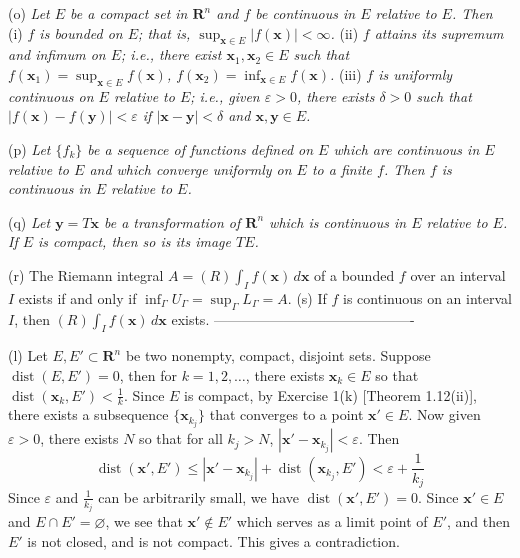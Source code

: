 \documentclass[12pt]{article}
\theoremstyle{definition}
\begin{document}
(o) 
\textit{Let $E$ be a compact set in $\mathbf{R}^n$ and $f$ be continuous in $E$ relative to $E$. Then}
(i) \textit{$f$ is bounded on $E$; that is, $\sup_{\mathbf{x}\in E}\left\vert f(\mathbf{x})\right\vert<\infty$.}
(ii) \textit{$f$ attains its supremum and infimum on $E$; i.e., there exist $\mathbf{x}_1,\mathbf{x}_2\in E$ such that $f(\mathbf{x}_1)=\sup_{\mathbf{x}\in E}f(\mathbf{x})$, $f(\mathbf{x}_2)=\inf_{\mathbf{x}\in E}f(\mathbf{x})$.}
(iii) \textit{$f$ is uniformly continuous on $E$ relative to $E$; i.e., given $\varepsilon>0$, there exists $\delta>0$ such that $\left\vert f(\mathbf{x})-f(\mathbf{y})\right\vert<\varepsilon$ if $\left\vert \mathbf{x}-\mathbf{y}\right\vert<\delta$ and $\mathbf{x},\mathbf{y}\in E$.}

(p) 
\textit{Let $\{f_k\}$ be a sequence of functions defined on $E$ which are continuous in $E$ relative to $E$ and which converge uniformly on $E$ to a finite $f$. Then $f$ is continuous in $E$ relative to $E$.}

(q) 
\textit{Let $\mathbf{y}=T\mathbf{x}$ be a transformation of $\mathbf{R}^n$ which is continuous in $E$ relative to $E$. If $E$ is compact, then so is its image $TE$.}

(r) The Riemann integral $A=(R)\int_If(\mathbf{x})\,d\mathbf{x}$ of a bounded $f$ over an interval $I$ exists if and only if $\inf_{\Gamma}U_{\Gamma}=\sup_{\Gamma}L_{\Gamma}=A$.
(s) If $f$ is continuous on an interval $I$, then $(R)\int_If(\mathbf{x})\,d\mathbf{x}$ exists.
-------------------------------------------

(l) Let $E,E'\subset\mathbf{R}^n$ be two nonempty, compact, disjoint sets. Suppose $\operatorname{dist}(E,E')=0$, then for $k=1,2,\ldots$, there exists $\mathbf{x}_k\in E$ so that $\operatorname{dist}(\mathbf{x}_k,E')<\frac{1}{k}$. Since $E$ is compact, by Exercise 1(k) [Theorem 1.12(ii)], there exists a subsequence $\{\mathbf{x}_{k_j}\}$ that converges to a point $\mathbf{x}'\in E$. Now given $\varepsilon>0$, there exists $N$ so that for all $k_j>N$, $\left\vert\mathbf{x}'-\mathbf{x}_{k_j}\right\vert<\varepsilon$. Then
$$
\operatorname{dist}(\mathbf{x}',E')
\le\left\vert\mathbf{x}'-\mathbf{x}_{k_j}\right\vert+\operatorname{dist}(\mathbf{x}_{k_j},E')
<\varepsilon+\frac{1}{k_j}
$$
Since $\varepsilon$ and $\frac{1}{k_j}$ can be arbitrarily small, we have $\operatorname{dist}(\mathbf{x}',E')=0$. Since  $\mathbf{x}'\in E$ and $E\cap E'=\varnothing$, we see that $\mathbf{x}'\notin E'$ which serves as a limit point of $E'$, and then $E'$ is not closed, and is not compact. This gives a contradiction.
\end{document}
